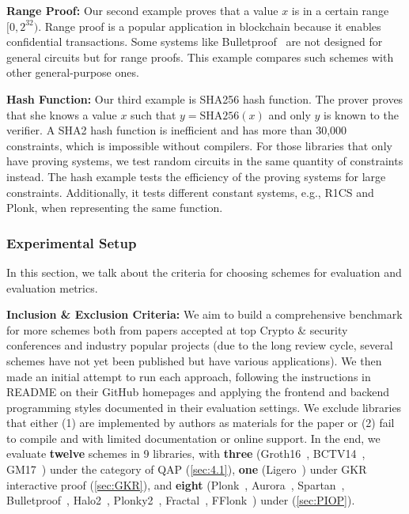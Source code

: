 \documentclass[letterpaper,twocolumn,10pt]{article}
\theoremstyle{definition}
\newcommand{\mypara}[1]{\noindent\textbf{{#1: }}}
\newcommand{\zk}{\text{zk-SNARK}\xspace}
\begin{document}
\mypara{Range Proof} Our second example proves that a value $x$ is in a certain range $[0, 2^{32})$. Range proof is a popular application in blockchain because it enables confidential transactions. Some systems like Bulletproof~\cite{bunz2018bulletproofs} are not designed for general circuits but for range proofs. This example compares such schemes with other general-purpose ones.

\mypara{Hash Function} Our third example is SHA256 hash function. The prover proves that she knows a value $x$ such that $y=\text{SHA256}(x)$ and only $y$ is known to the verifier. A SHA2 hash function is inefficient and has more than 30,000 constraints, which is impossible without compilers. For those libraries that only have proving systems, we test random circuits in the same quantity of constraints instead. The hash example tests the efficiency of the proving systems for large constraints. Additionally, it tests different constant systems, e.g., R1CS and Plonk, when representing the same function.



\subsubsection{Experimental Setup}
In this section, we talk about the criteria for choosing schemes for evaluation and evaluation metrics.

\mypara{Inclusion \& Exclusion Criteria} We aim to build a comprehensive benchmark for more \zk schemes both from papers accepted at top Crypto \& security conferences and industry popular projects (due to the long review cycle, several schemes have not yet been published but have various applications). We then made an initial attempt to run each approach, following the instructions in README on their GitHub homepages and applying the frontend and backend programming styles documented in their evaluation settings. We exclude libraries that either (1) are implemented by authors as materials for the paper or (2) fail to compile and with limited documentation or online support. In the end, we evaluate \textbf{twelve} schemes in {9} libraries, with \textbf{three} (Groth16~\cite{groth2016size}, BCTV14~\cite{ben2014succinct}, GM17~\cite{groth2017snarky}) under the category of QAP (\autoref{sec:4.1}), 
\textbf{one} (Ligero~\cite{ames2017ligero}) under GKR interactive proof (\autoref{sec:GKR}),
and \textbf{eight} (Plonk~\cite{gabizon2019plonk}, Aurora~\cite{ben2019aurora}, Spartan~\cite{setty2020spartan}, Bulletproof~\cite{bunz2018bulletproofs}, Halo2~\cite{halo2book}, 
Plonky2~\cite{plonky2},
Fractal~\cite{chiesa2020fractal},
FFlonk~\cite{gabizon2021fflonk}) 
under  (\autoref{sec:PIOP}). 
\end{document}
